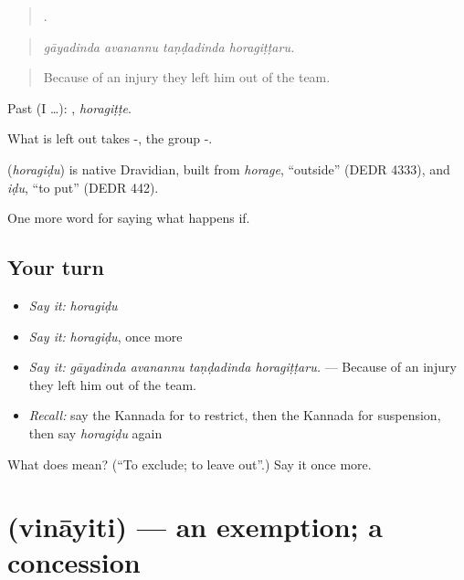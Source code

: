 \begin{quote}
   .
\end{quote}

\begin{quote}
\emph{gāyadinda avanannu taṇḍadinda horagiṭṭaru.}
\end{quote}

\begin{quote}
Because of an injury they left him out of the team.
\end{quote}

Past (I …): , \emph{horagiṭṭe}.

What is left out takes -, the group -.

\begin{cousinweb}
\textbf{} (\emph{horagiḍu}) is native Dravidian, built from \emph{horage}, \textquotedblleft{}outside\textquotedblright{} (DEDR 4333), and \emph{iḍu}, \textquotedblleft{}to put\textquotedblright{} (DEDR 442).
\end{cousinweb}

\begin{grammarlens}[title={What you've built}]
One more word for saying what happens if.
\end{grammarlens}

\subsection*{Your turn}
\begin{itemize}
\raggedright
  \item \emph{Say it:} \emph{horagiḍu}
  \item \emph{Say it:} \emph{horagiḍu}, once more
  \item \emph{Say it:} \emph{gāyadinda avanannu taṇḍadinda horagiṭṭaru.} — Because of an injury they left him out of the team.
  \item \emph{Recall:} say the Kannada for to restrict, then the Kannada for suspension, then say \emph{horagiḍu} again
\end{itemize}

\begin{tcolorbox}[breakable,colback=teal!4,colframe=teal!35!black,title={Before you move on}]
What does  mean? (\textquotedblleft{}To exclude; to leave out\textquotedblright{}.) Say it once more.
\end{tcolorbox}
\section[\texorpdfstring{\kn{ವಿನಾಯಿತಿ} (vināyiti)}{ವಿನಾಯಿತಿ (vināyiti)}]{ (vināyiti) — an exemption; a concession}

